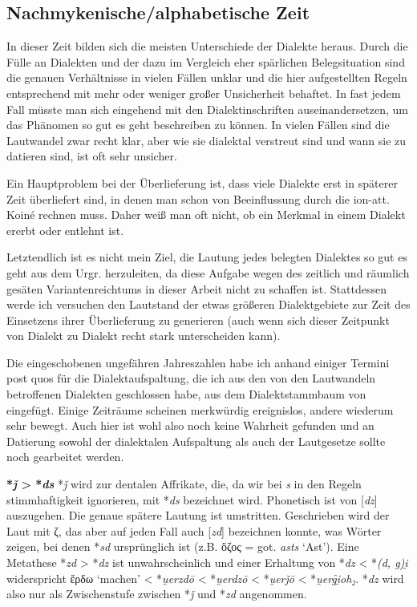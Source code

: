 \documentclass[12pt,a4paper,normalheadings]{scrartcl}
\newcounter{para}
\newcommand{\mypara}[1]{\vspace{1em}\par\noindent\refstepcounter{para}%
\textbf{\textsf{\thepara}}\enspace\textbf{#1}\quad}
\def\rek#1{*\textit{#1}}
\def\bel#1{\textit{#1}}
\begin{document}
\subsection{Nachmykenische/alphabetische Zeit}
In dieser Zeit bilden sich die meisten Unterschiede der Dialekte heraus.
Durch die Fülle an Dialekten und der dazu im Vergleich eher
spärlichen Belegsituation sind die genauen Verhältnisse
in vielen Fällen unklar und die hier aufgestellten Regeln
entsprechend mit mehr oder weniger großer Unsicherheit behaftet.
In fast jedem Fall müsste man sich eingehend mit den Dialektinschriften
auseinandersetzen, um das Phänomen so gut es geht beschreiben zu können.
In vielen Fällen sind die Lautwandel zwar recht klar,
aber wie sie dialektal verstreut sind und wann sie zu datieren sind,
ist oft sehr unsicher.

Ein Hauptproblem bei der Überlieferung ist,
dass viele Dialekte erst in späterer Zeit überliefert sind,
in denen man schon von Beeinflussung durch die ion-att. Koiné rechnen muss.
Daher weiß man oft nicht,
ob ein Merkmal in einem Dialekt ererbt oder entlehnt ist.

Letztendlich ist es nicht mein Ziel,
die Lautung jedes belegten Dialektes so gut es geht aus dem Urgr. herzuleiten,
da diese Aufgabe wegen des zeitlich und räumlich gesäten Variantenreichtums
in dieser Arbeit nicht zu schaffen ist.
Stattdessen werde ich versuchen den Lautstand der etwas größeren Dialektgebiete
zur Zeit des Einsetzens ihrer Überlieferung zu generieren
(auch wenn sich dieser Zeitpunkt von Dialekt zu Dialekt recht stark unterscheiden kann).

Die eingeschobenen ungefähren Jahreszahlen habe ich anhand einiger Termini
post quos für die Dialektaufspaltung,
die ich aus den von den Lautwandeln betroffenen Dialekten geschlossen habe,
aus dem Dialektstammbaum von \textcite{bart_frueh} eingefügt.
Einige Zeiträume scheinen merkwürdig ereignislos, andere wiederum sehr bewegt.
Auch hier ist wohl also noch keine Wahrheit gefunden und
an Datierung sowohl der dialektalen Aufspaltung als auch der Lautgesetze
sollte noch gearbeitet werden.

\mypara{\rek{ǰ} > \rek{ds}}
\rek{ǰ} wird zur dentalen Affrikate, die,
da wir bei \bel{s} in den Regeln stimmhaftigkeit ignorieren,
mit \rek{ds} bezeichnet wird.
Phonetisch ist von [\bel{dz}] auszugehen.
Die genaue spätere Lautung ist umstritten.
Geschrieben wird der Laut mit ζ,
das aber auf jeden Fall auch [\bel{zd}] bezeichnen konnte,
was Wörter zeigen, bei denen \rek{sd} ursprünglich ist
(z.B. ὄζος = got. \bel{asts} `Ast').
Eine Metathese \rek{zd} > \rek{dz} ist unwahrscheinlich
und einer Erhaltung von \rek{dz} < \rek{(d, g)i̯} widerspricht
ἔρδω `machen' < \rek{u̯erzdō} < \rek{u̯erdzō} < \rek{u̯erǰō} < \rek{u̯erg̑i̯oh₂}.
\rek{dz} wird also nur als Zwischenstufe zwischen \rek{ǰ} und \rek{zd}
angenommen.
\end{document}
